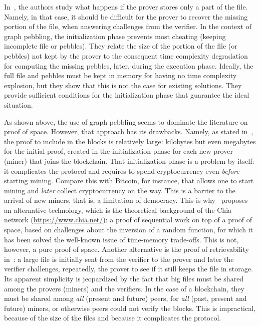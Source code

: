 In~\cite{Reyzin23}, the authors study what happens if the prover stores only a part of the file.
Namely, in that case, it should be difficult for the prover to recover the
missing portion of the file, when answering challenges from the verifier.
In the context of graph pebbling, the initialization phase prevents most cheating
(keeping incomplete file or pebbles). They relate the size
of the portion of the file (or pebbles) not kept by the prover to the consequent time complexity degradation
for computing the missing pebbles, later, during the execution phase.
Ideally, the full file and pebbles must be kept in memory
for having no time complexity explosion, but they show that this is not the case for existing solutions.
They provide sufficient conditions for the initialization phase that guarantee the ideal situation.

As shown above, the use of graph pebbling seems to dominate the literature on proof of space.
However, that approach has its drawbacks.
Namely, as stated in~\cite{AbusalahACKPR17}, the proof to include in the blocks is relatively large:
kilobytes but even megabytes for the initial proof, created in the initialization phase for each new
prover (miner) that joins the blockchain. That initialization phase is a problem by itself: it complicates
the protocol and requires to spend cryptocurrency even \emph{before}
starting mining. Compare this with Bitcoin, for instance, that allows one to start mining
and \emph{later} collect cryptocurrency on the way. This is a barrier to the arrival of new
miners, that is, a limitation of democracy.
This is why~\cite{AbusalahACKPR17} proposes an alternative technology, which is the
theoretical background of the Chia network (\url{https://www.chia.net/}):
a proof of sequential work on top of a proof of space, based on challenges
about the inversion of a random function, for which it has been solved
the well-known issue of time-memory trade-offs. This is not, however, a pure proof of space.
Another alternative is the proof of retrievability in~\cite{JuelsK07}: a large file
is initially sent from the verifier to the prover and later the verifier
challenges, repeatedly, the prover to see if it still keeps the file in storage.
Its apparent simplicity
is jeopardized by the fact that big files must be shared among the provers (miners) and
the verifiers. In the case of a blockchain, they must be shared among \emph{all} (present and future)
peers, for \emph{all} (past, present and future) miners, or otherwise peers could not verify the blocks.
This is impractical, because of the size of the files and because it complicates the protocol.


